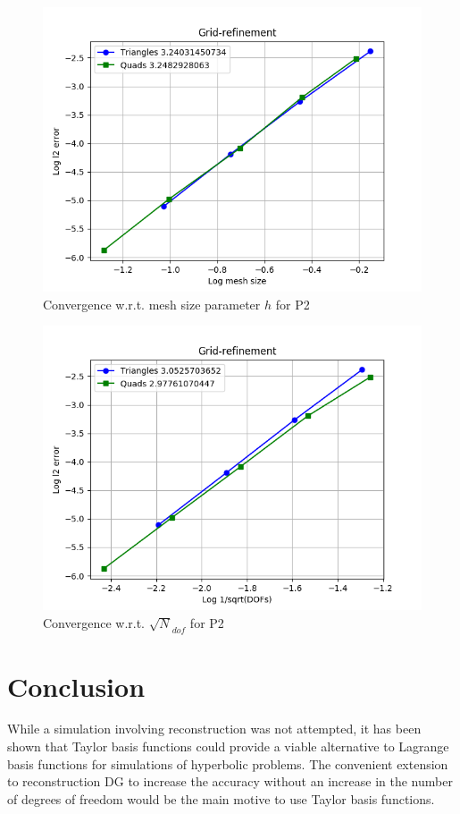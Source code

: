\documentclass[11pt]{article}
\begin{document}
\begin{figure}
	\centering
	\includegraphics[scale=0.7]{linadv-taylor-p2}
	\caption{Convergence w.r.t. mesh size parameter $h$ for P2}
\end{figure}
\begin{figure}
	\centering
	\includegraphics[scale=0.7]{linadv-taylor-p2-dofs}
	\caption{Convergence w.r.t. $\sqrt N_{dof}$ for P2}
\end{figure}

\section{Conclusion}
While a simulation involving reconstruction was not attempted, it has been shown that Taylor basis functions could provide a viable alternative to Lagrange basis functions for simulations of hyperbolic problems. The convenient extension to reconstruction DG to increase the accuracy without an increase in the number of degrees of freedom would be the main motive to use Taylor basis functions.


\end{document}
